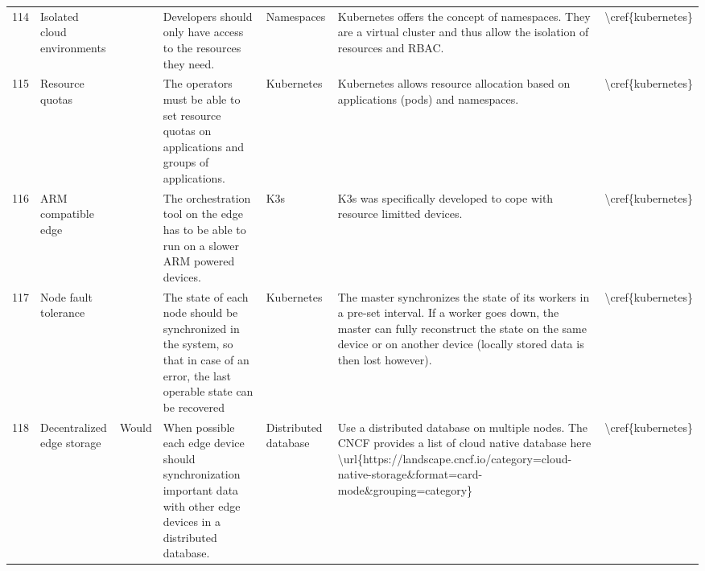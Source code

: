 \begin{table}[]
\begin{tabular}{lllllll}
114 & Isolated cloud environments             &                & Developers should only have access to the resources they need.                                                                                                                             & Namespaces               & Kubernetes offers the concept of namespaces. They are a virtual cluster and thus allow the isolation of resources and RBAC.                                                                                                    & \textbackslash{}cref\{kubernetes\} \\
115 & Resource quotas                         &                & The operators must be able to set resource quotas on applications and groups of applications.                                                                                              & Kubernetes               & Kubernetes allows resource allocation based on applications (pods) and namespaces.                                                                                                                                             & \textbackslash{}cref\{kubernetes\} \\
116 & ARM compatible edge                     &                & The orchestration tool on the edge has to be able to run on a slower ARM powered devices.                                                                                                  & K3s                      & K3s was specifically developed to cope with resource limitted devices.                                                                                                                                                         & \textbackslash{}cref\{kubernetes\} \\
117 & Node fault tolerance                    &                & The state of each node should be synchronized in the system, so that in case of an error, the last operable state can be recovered                                                         & Kubernetes               & The master synchronizes the state of its workers in a pre-set interval. If a worker goes down, the master can fully reconstruct the state on the same device or on another device (locally stored data is then lost however).  & \textbackslash{}cref\{kubernetes\} \\
118 & Decentralized edge storage              & Would          & When possible each edge device should synchronization important data with other edge devices in a distributed database.                                                                    & Distributed database     & Use a distributed database on multiple nodes. The CNCF provides a list of cloud native database here \textbackslash{}url\{https://landscape.cncf.io/category=cloud-native-storage\&format=card-mode\&grouping=category\}       & \textbackslash{}cref\{kubernetes\} \\

\end{tabular}
\end{table}
